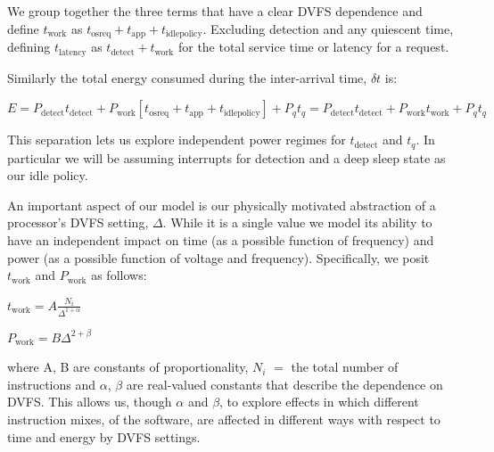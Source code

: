 We group together the three terms that have a clear DVFS dependence and define
$t_{\text{work}}$ as $t_{\text{osreq}} + t_{\text{app}} + t_{\text{idlepolicy}}$.  Excluding detection and any quiescent time, defining $t_{\text{latency}}$ as $t_{\text{detect}} + t_{\text{work}}$ for the total service time or latency for a request.



Similarly the total energy consumed during the inter-arrival time, $\delta t$ is:

$\boxed{E = P_\text{detect} t_{\text{detect}} + P_{\text{work}} \left[t_{\text{osreq}} + t_{\text{app}} + t_{\text{idlepolicy}}\right] + P_q t_q} = P_\text{detect} t_{\text{detect}} + P_{\text{work}} t_{\text{work}} + P_q t_q$

This separation lets us explore independent power regimes for $t_{\text{detect}}$ and $t_q$.  In particular we will be assuming interrupts for detection and a deep sleep state as our idle policy.    

An important aspect of our model is our physically motivated abstraction of a processor's DVFS setting, $\Delta$.  While it is a single value we model its ability to have an independent impact on time (as a possible function of frequency) and power (as a possible function of voltage and frequency).  Specifically, we posit 
$t_{\text{work}}$ and $P_{\text{work}}$ as follows:

$t_{\text{work}} = A\frac{N_i}{\Delta^{1+\alpha}}$

$P_{\text{work}} = B \Delta^{2+\beta}$

where A, B are constants of proportionality, $N_i$ $=$ the total number of instructions and $\alpha$, $\beta$ are real-valued constants that describe the dependence on DVFS.  This allows us, though $\alpha$ and $\beta$, to explore effects in which different instruction mixes, of the software, are affected in different ways with respect to time and energy by DVFS settings.  


